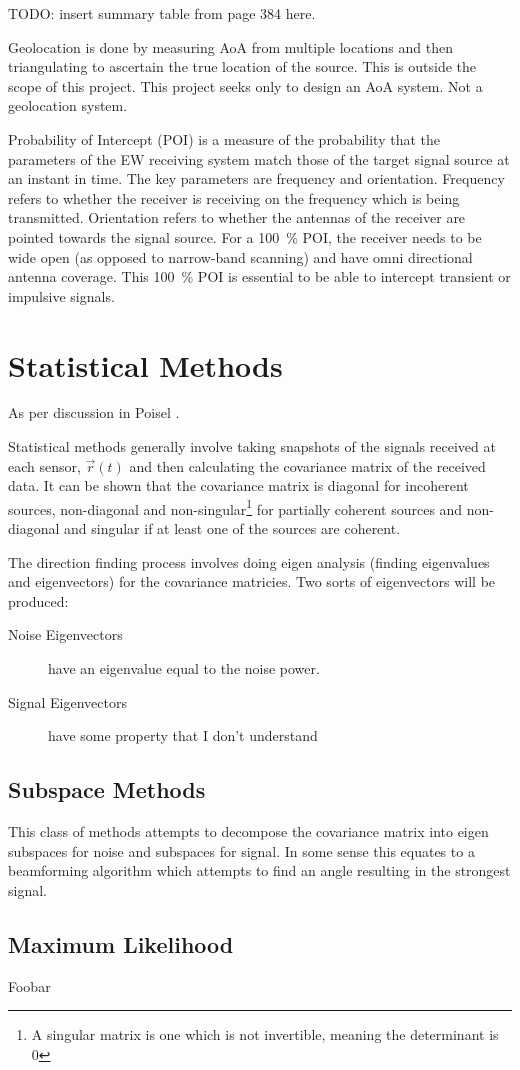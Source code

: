 TODO: insert summary table from page 384 here.

Geolocation is done by measuring AoA from multiple locations and then triangulating to ascertain the true location of the source. This is outside the scope of this project. This project seeks only to design an AoA system. Not a geolocation system. 

Probability of Intercept (POI) is a measure of the probability that the parameters of the EW receiving system match those of the target signal source at an instant in time. The key parameters are frequency and orientation. Frequency refers to whether the receiver is receiving on the frequency which is being transmitted. Orientation refers to whether the antennas of the receiver are pointed towards the signal source. 
For a \SI{100}{\percent} POI, the receiver needs to be wide open (as opposed to narrow-band scanning) and have omni directional antenna coverage. This \SI{100}{\percent} POI is essential to be able to intercept transient or impulsive signals.

\section{Statistical Methods}

As per discussion in Poisel \cite{poisel2012electronic}. 

Statistical methods generally involve taking snapshots of the signals received at each sensor, \(\vec{r}(t)\) and then calculating the covariance matrix of the received data.
It can be shown that the covariance matrix is diagonal for incoherent sources, non-diagonal and non-singular\footnote{A singular matrix is one which is not invertible, meaning the determinant is 0} for partially coherent sources and non-diagonal and singular if at least one of the sources are coherent\cite{poisel2012electronic}. 

The direction finding process involves doing eigen analysis (finding eigenvalues and eigenvectors) for the covariance matricies. 
Two sorts of eigenvectors will be produced:
\begin{description}
  \item[Noise Eigenvectors] have an eigenvalue equal to the noise power.
  \item[Signal Eigenvectors] have some property that I don't understand
\end{description}

\subsection{Subspace Methods}
This class of methods attempts to decompose the covariance matrix into eigen subspaces for noise and subspaces for signal. In some sense this equates to a beamforming algorithm which attempts to find an angle resulting in the strongest signal. 

\subsection{Maximum Likelihood}
Foobar
